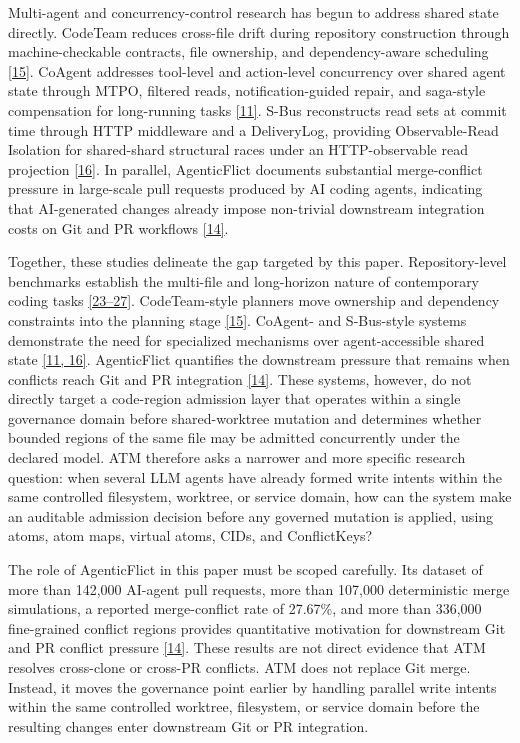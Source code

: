 \documentclass[9pt,letterpaper]{extarticle}
\begin{document}
Multi-agent and concurrency-control research has begun to address shared state directly. CodeTeam reduces cross-file drift during repository construction through machine-checkable contracts, file ownership, and dependency-aware scheduling \textcolor{atmLinkBlue}{\hyperlink{Item.51}{[15]}}. CoAgent addresses tool-level and action-level concurrency over shared agent state through MTPO, filtered reads, notification-guided repair, and saga-style compensation for long-running tasks \textcolor{atmLinkBlue}{\hyperlink{Item.47}{[11]}}. S-Bus reconstructs read sets at commit time through HTTP middleware and a DeliveryLog, providing Observable-Read Isolation for shared-shard structural races under an HTTP-observable read projection \textcolor{atmLinkBlue}{\hyperlink{Item.52}{[16]}}. In parallel, AgenticFlict documents substantial merge-conflict pressure in large-scale pull requests produced by AI coding agents, indicating that AI-generated changes already impose non-trivial downstream integration costs on Git and PR workflows \textcolor{atmLinkBlue}{\hyperlink{Item.50}{[14]}}.

Together, these studies delineate the gap targeted by this paper. Repository-level benchmarks establish the multi-file and long-horizon nature of contemporary coding tasks \textcolor{atmLinkBlue}{\hyperlink{Item.59}{[23--27]}}. CodeTeam-style planners move ownership and dependency constraints into the planning stage \textcolor{atmLinkBlue}{\hyperlink{Item.51}{[15]}}. CoAgent- and S-Bus-style systems demonstrate the need for specialized mechanisms over agent-accessible shared state \textcolor{atmLinkBlue}{\hyperlink{Item.47}{[11, 16]}}. AgenticFlict quantifies the downstream pressure that remains when conflicts reach Git and PR integration \textcolor{atmLinkBlue}{\hyperlink{Item.50}{[14]}}. These systems, however, do not directly target a code-region admission layer that operates within a single governance domain before shared-worktree mutation and determines whether bounded regions of the same file may be admitted concurrently under the declared model. ATM therefore asks a narrower and more specific research question: when several LLM agents have already formed write intents within the same controlled filesystem, worktree, or service domain, how can the system make an auditable admission decision before any governed mutation is applied, using atoms, atom maps, virtual atoms, CIDs, and \mbox{ConflictKeys}?

The role of AgenticFlict in this paper must be scoped carefully. Its dataset of more than 142,000 AI-agent pull requests, more than 107,000 deterministic merge simulations, a reported merge-conflict rate of 27.67\%, and more than 336,000 fine-grained conflict regions provides quantitative motivation for downstream Git and PR conflict pressure \textcolor{atmLinkBlue}{\hyperlink{Item.50}{[14]}}. These results are not direct evidence that ATM resolves cross-clone or cross-PR conflicts. ATM does not replace Git merge. Instead, it moves the governance point earlier by handling parallel write intents within the same controlled worktree, filesystem, or service domain before the resulting changes enter downstream Git or PR integration.
\end{document}

